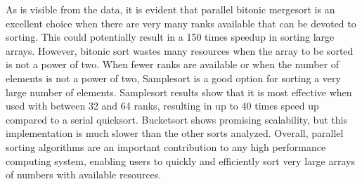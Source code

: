 \documentclass[10pt,letterpaper]{article}
\begin{document}
\begin{multicols}{2}
As is visible from the data, it is evident that parallel bitonic mergesort is an excellent choice when there are very many ranks available that can be devoted to sorting. This could potentially result in a 150 times speedup in sorting large arrays. However, bitonic sort wastes many resources when the array to be sorted is not a power of two. When fewer ranks are available or when the number of elements is not a power of two, Samplesort is a good option for sorting a very large number of elements. Samplesort results show that it is most effective when used with between 32 and 64 ranks, resulting in up to 40 times speed up compared to a serial quicksort. Bucketsort shows promising scalability, but this implementation is much slower than the other sorts analyzed. Overall, parallel sorting algorithms are an important contribution to any high performance computing system, enabling users to quickly and efficiently sort very large arrays of numbers with available resources.



\end{multicols}
\end{document}
